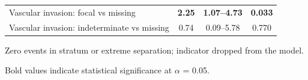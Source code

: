 \begin{table}[htbp]
\begin{threeparttable}
\begin{tabular}{@{}lccc@{}}
Vascular invasion: focal vs missing & \textbf{2.25} & \textbf{1.07--4.73} & \textbf{0.033} \\
Vascular invasion: indeterminate vs missing & 0.74 & 0.09--5.78 & 0.770 \\
\bottomrule
\end{tabular}
\begin{tablenotes}
\small
\item[\textsuperscript{a}] Zero events in stratum or extreme separation; indicator dropped from the model.
\item Bold values indicate statistical significance at $\alpha$ = 0.05.
\end{tablenotes}
\end{threeparttable}
\end{table}


